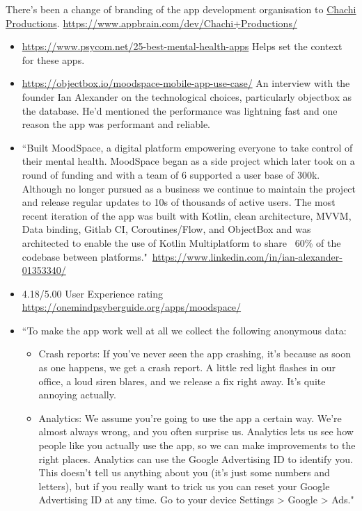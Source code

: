 There's been a change of branding of the app development organisation to \href{https://play.google.com/store/apps/developer?id=Chachi+Productions&hl=en_GB&gl=US}{Chachi Productions}. \url{https://www.appbrain.com/dev/Chachi+Productions/}


\begin{itemize}
    \item \url{https://www.psycom.net/25-best-mental-health-apps} Helps set the context for these apps.
    \item \url{https://objectbox.io/moodspace-mobile-app-use-case/} An interview with the founder Ian Alexander on the technological choices, particularly objectbox as the database. He'd mentioned the performance was lightning fast and one reason the app was performant and reliable. 
    \item ``Built MoodSpace, a digital platform empowering everyone to take control of their mental health. MoodSpace began as a side project which later took on a round of funding and with a team of 6 supported a user base of 300k. Although no longer pursued as a business we continue to maintain the project and release regular updates to 10s of thousands of active users. The most recent iteration of the app was built with Kotlin, clean architecture, MVVM, Data binding, Gitlab CI, Coroutines/Flow, and ObjectBox and was architected to enable the use of Kotlin Multiplatform to share ~60\% of the codebase between platforms."~\url{https://www.linkedin.com/in/ian-alexander-01353340/}
    \item 4.18/5.00 User Experience rating \url{https://onemindpsyberguide.org/apps/moodspace/}
    \item ``To make the app work well at all we collect the following anonymous data:
    \begin{itemize}
        \item Crash reports: If you've never seen the app crashing, it's because as soon as one happens, we get a crash report. A little red light flashes in our office, a loud siren blares, and we release a fix right away. It's quite annoying actually.
        \item Analytics: We assume you're going to use the app a certain way. We're almost always wrong, and you often surprise us. Analytics lets us see how people like you actually use the app, so we can make improvements to the right places. Analytics can use the Google Advertising ID to identify you. This doesn't tell us anything about you (it's just some numbers and letters), but if you really want to trick us you can reset your Google Advertising ID at any time. Go to your device Settings > Google > Ads."
    \end{itemize}~\citep{moodspace2021_privacy_policy}
\end{itemize}


